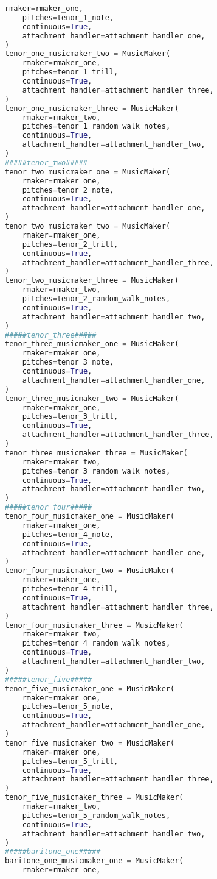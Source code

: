 \begin{lstlisting}[language=Python, caption=Invocation Source Code]
    rmaker=rmaker_one,
    pitches=tenor_1_note,
    continuous=True,
    attachment_handler=attachment_handler_one,
)
tenor_one_musicmaker_two = MusicMaker(
    rmaker=rmaker_one,
    pitches=tenor_1_trill,
    continuous=True,
    attachment_handler=attachment_handler_three,
)
tenor_one_musicmaker_three = MusicMaker(
    rmaker=rmaker_two,
    pitches=tenor_1_random_walk_notes,
    continuous=True,
    attachment_handler=attachment_handler_two,
)
#####tenor_two#####
tenor_two_musicmaker_one = MusicMaker(
    rmaker=rmaker_one,
    pitches=tenor_2_note,
    continuous=True,
    attachment_handler=attachment_handler_one,
)
tenor_two_musicmaker_two = MusicMaker(
    rmaker=rmaker_one,
    pitches=tenor_2_trill,
    continuous=True,
    attachment_handler=attachment_handler_three,
)
tenor_two_musicmaker_three = MusicMaker(
    rmaker=rmaker_two,
    pitches=tenor_2_random_walk_notes,
    continuous=True,
    attachment_handler=attachment_handler_two,
)
#####tenor_three#####
tenor_three_musicmaker_one = MusicMaker(
    rmaker=rmaker_one,
    pitches=tenor_3_note,
    continuous=True,
    attachment_handler=attachment_handler_one,
)
tenor_three_musicmaker_two = MusicMaker(
    rmaker=rmaker_one,
    pitches=tenor_3_trill,
    continuous=True,
    attachment_handler=attachment_handler_three,
)
tenor_three_musicmaker_three = MusicMaker(
    rmaker=rmaker_two,
    pitches=tenor_3_random_walk_notes,
    continuous=True,
    attachment_handler=attachment_handler_two,
)
#####tenor_four#####
tenor_four_musicmaker_one = MusicMaker(
    rmaker=rmaker_one,
    pitches=tenor_4_note,
    continuous=True,
    attachment_handler=attachment_handler_one,
)
tenor_four_musicmaker_two = MusicMaker(
    rmaker=rmaker_one,
    pitches=tenor_4_trill,
    continuous=True,
    attachment_handler=attachment_handler_three,
)
tenor_four_musicmaker_three = MusicMaker(
    rmaker=rmaker_two,
    pitches=tenor_4_random_walk_notes,
    continuous=True,
    attachment_handler=attachment_handler_two,
)
#####tenor_five#####
tenor_five_musicmaker_one = MusicMaker(
    rmaker=rmaker_one,
    pitches=tenor_5_note,
    continuous=True,
    attachment_handler=attachment_handler_one,
)
tenor_five_musicmaker_two = MusicMaker(
    rmaker=rmaker_one,
    pitches=tenor_5_trill,
    continuous=True,
    attachment_handler=attachment_handler_three,
)
tenor_five_musicmaker_three = MusicMaker(
    rmaker=rmaker_two,
    pitches=tenor_5_random_walk_notes,
    continuous=True,
    attachment_handler=attachment_handler_two,
)
#####baritone_one#####
baritone_one_musicmaker_one = MusicMaker(
    rmaker=rmaker_one,

\end{lstlisting}
